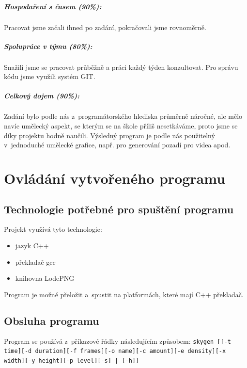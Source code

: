 \documentclass[12pt,a4paper,titlepage,final]{report}
\begin{document}
\paragraph{Hospodaření s časem (90\%):}
Pracovat jsme začali ihned po zadání, pokračovali jsme rovnoměrně.

\paragraph{Spolupráce v týmu (80\%):}
Snažili jsme se pracovat průběžně a práci každý týden konzultovat. Pro
správu kódu jsme využili systém GIT.

\paragraph{Celkový dojem (90\%):}
Zadání bylo podle nás z~programátorského hlediska průměrně náročné, ale
mělo navíc umělecký aspekt, se kterým se na škole příliš nesetkáváme,
proto jsme se díky projektu hodně naučili. Výsledný program je podle
nás použitelný v~jednoduché umělecké grafice, např. pro generování pozadí
pro videa apod.

\chapter{Ovládání vytvořeného programu}

\section{Technologie potřebné pro spuštění programu}
Projekt využívá tyto technologie:

\begin{itemize}
\item jazyk C++
\item překladač gcc
\item knihovna LodePNG
\end{itemize}

Program je možné přeložit a~spustit na platformách, které mají C++
překladač.

\section{Obsluha programu}

Program se používá z~příkazové řádky následujícím způsobem:
{\tt skygen [[-t time][-d duration][-f frames][-o name][-c amount][-e density][-x width][-y height][-p level][-s] | [-h]]}
\end{document}

